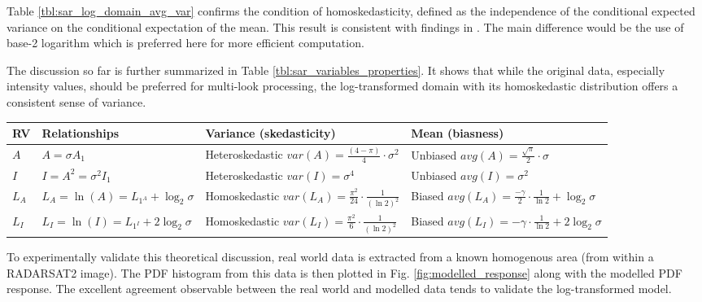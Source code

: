 Table \ref{tbl:sar_log_domain_avg_var} confirms the condition of homoskedasticity,  
defined as the independence of the conditional expected variance on the conditional expectation of the mean. 
This result is consistent with findings in \cite{Arsenault_JOptSocAm_1976}. 
The main difference would be the use of base-2 logarithm which is preferred here for more efficient computation. 

The discussion so far is further summarized in Table \ref{tbl:sar_variables_properties}.
It shows that while the original data, especially intensity values, should be preferred for 
multi-look processing, the log-transformed domain with its homoskedastic distribution offers a consistent sense of variance. 

\begin{table*}[t]
\scriptsize
\centering

\begin{tabular}{|l|l|l|l|}
\hline
 RV & Relationships  & Variance (skedasticity) & Mean (biasness) \\
\hline
$A$ 
	& $A=\sigma A_1 $ 
	& Heteroskedastic $var(A) = \frac{(4-\pi)}{4} \cdot \sigma^2 $ 
	& Unbiased $avg(A) = \frac{\sqrt{\pi}}{2} \cdot \sigma $ \\
$I$ 
	& $I=A^2=\sigma^2 I_1 $ 
	& Heteroskedastic $ var(I) = \sigma^4$ 
	& Unbiased $avg(I) = \sigma^2 $\\
$L_A$ 
	& $L_A=\ln(A)=L_{1^A} + \log_2{\sigma}$ 
	& Homoskedastic $var(L_A) = \frac{ \pi ^2}{24} \cdot \frac{1}{(\ln2)^2}$ 
	& Biased $avg(L_A) = \frac{ - \gamma }{2} \cdot \frac{1}{\ln2} + \log_2{\sigma}$ \\
$L_I$ 
	& $L_I=\ln(I)=L_{1^I} + 2 \log_2{\sigma}$  
	& Homoskedastic $var(L_I) = \frac{ \pi ^2}{6} \cdot \frac{1}{(\ln2)^2}$ 
	& Biased $avg(L_I) = - \gamma \cdot \frac{1}{\ln2} + 2 \log_2{\sigma}  $ \\
\hline
\end{tabular}

\caption{ The properties of observable SAR random variables }
\label{tbl:sar_variables_properties}

\end{table*}

To experimentally validate this theoretical discussion, real world data is extracted from a known  homogenous area (from within a RADARSAT2 image). The PDF histogram from this data is then plotted in 
Fig. \ref{fig:modelled_response} along with the modelled PDF response. 
The excellent agreement observable between the real world and modelled data tends to validate the log-transformed model. 

